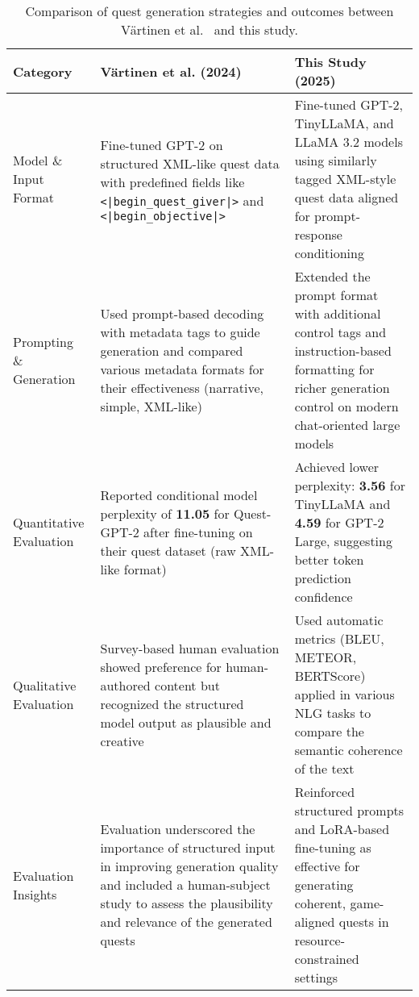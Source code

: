 \begin{table}[t]
  \centering
  \scriptsize
  \renewcommand{\arraystretch}{1.3}
  \begin{tabularx}{0.95\textwidth}{
    >{\raggedright\arraybackslash}p{3.5cm}
    >{\raggedright\arraybackslash}X
    >{\raggedright\arraybackslash}X
  }
    \toprule
    \textbf{Category} & \textbf{V{\"a}rtinen et al. (2024)~\cite{vartinen2022generating}} & \textbf{This Study (2025)} \\
    \midrule
    Model \& Input Format
      & Fine-tuned GPT-2 on structured XML-like quest data with predefined fields like \texttt{<|begin\_quest\_giver|>} and \texttt{<|begin\_objective|>}
      & Fine-tuned GPT-2, TinyLLaMA, and LLaMA 3.2 models using similarly tagged XML-style quest data aligned for prompt-response conditioning \\
    Prompting \& Generation
      & Used prompt-based decoding with metadata tags to guide generation and compared various metadata formats for their effectiveness (narrative, simple, XML-like)
      & Extended the prompt format with additional control tags and instruction-based formatting for richer generation control on modern chat-oriented large models \\
    Quantitative Evaluation
      & Reported conditional model perplexity of \textbf{11.05} for Quest-GPT-2 after fine-tuning on their quest dataset (raw XML-like format)
      & Achieved lower perplexity: \textbf{3.56} for TinyLLaMA and \textbf{4.59} for GPT-2 Large, suggesting better token prediction confidence \\
    Qualitative Evaluation
      & Survey-based human evaluation showed preference for human-authored content but recognized the structured model output as plausible and creative
      & Used automatic metrics (BLEU, METEOR, BERTScore) applied in various NLG tasks to compare the semantic coherence of the text \\
    Evaluation Insights
      & Evaluation underscored the importance of structured input in improving generation quality and included a human-subject study to assess the plausibility and relevance of the generated quests
      & Reinforced structured prompts and LoRA-based fine-tuning as effective for generating coherent, game-aligned quests in resource-constrained settings \\
    \bottomrule
  \end{tabularx}
  \caption{Comparison of quest generation strategies and outcomes between V{\"a}rtinen et al.~\cite{vartinen2022generating} and this study.}
  \label{tab:vartinen-comparison}
\end{table}

